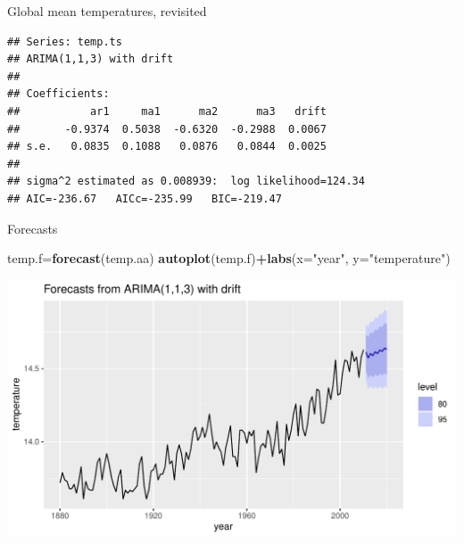 \documentclass[ignorenonframetext,]{beamer}
\newenvironment{Shaded}{\begin{snugshade}}{\end{snugshade}}
\newcommand{\DataTypeTok}[1]{\textcolor[rgb]{0.13,0.29,0.53}{#1}}
\newcommand{\DecValTok}[1]{\textcolor[rgb]{0.00,0.00,0.81}{#1}}
\newcommand{\KeywordTok}[1]{\textcolor[rgb]{0.13,0.29,0.53}{\textbf{#1}}}
\newcommand{\NormalTok}[1]{#1}
\newcommand{\OperatorTok}[1]{\textcolor[rgb]{0.81,0.36,0.00}{\textbf{#1}}}
\newcommand{\StringTok}[1]{\textcolor[rgb]{0.31,0.60,0.02}{#1}}
\begin{document}
\begin{frame}[fragile]{Global mean temperatures, revisited}
\protect\hypertarget{global-mean-temperatures-revisited}{}

\begin{Shaded}
\end{Shaded}

\begin{verbatim}
## Series: temp.ts 
## ARIMA(1,1,3) with drift 
## 
## Coefficients:
##           ar1     ma1      ma2      ma3   drift
##       -0.9374  0.5038  -0.6320  -0.2988  0.0067
## s.e.   0.0835  0.1088   0.0876   0.0844  0.0025
## 
## sigma^2 estimated as 0.008939:  log likelihood=124.34
## AIC=-236.67   AICc=-235.99   BIC=-219.47
\end{verbatim}

\end{frame}

\begin{frame}[fragile]{Forecasts}
\protect\hypertarget{forecasts-1}{}

\begin{Shaded}
\begin{Highlighting}[]
\NormalTok{temp.f=}\KeywordTok{forecast}\NormalTok{(temp.aa)}
\KeywordTok{autoplot}\NormalTok{(temp.f)}\OperatorTok{+}\KeywordTok{labs}\NormalTok{(}\DataTypeTok{x=}\StringTok{"year"}\NormalTok{, }\DataTypeTok{y=}\StringTok{"temperature"}\NormalTok{)}
\end{Highlighting}
\end{Shaded}

\includegraphics{figure/unnamed-chunk-628-1.pdf}

\end{frame}
\end{document}
